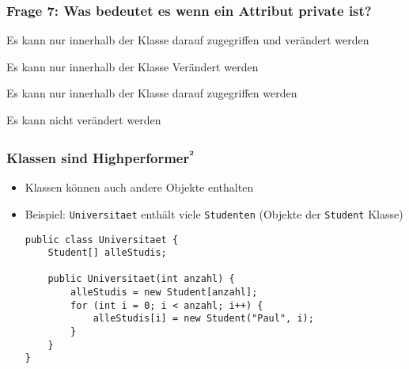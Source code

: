 \documentclass{../../presentation}
\begin{document}
\begin{frame}[fragile]
	\frametitle{Frage 7: Was bedeutet es wenn ein Attribut private ist?}
	\begin{ausgabe}
		\textcolor<2->{green!100!black}{Es kann nur innerhalb der Klasse darauf zugegriffen und verändert werden}
	\end{ausgabe}
	\begin{ausgabe}
		Es kann nur innerhalb der Klasse Verändert werden
	\end{ausgabe}
	\begin{ausgabe}
		Es kann nur innerhalb der Klasse darauf zugegriffen werden
	\end{ausgabe}
	\begin{ausgabe}
		Es kann nicht verändert werden
	\end{ausgabe}
\end{frame}

\begin{frame}[fragile]
	\frametitle{Klassen sind Highperformer\textsuperscript{²}}
	\pause
	\begin{itemize}
		\item Klassen können auch andere Objekte enthalten
		      \pause
		\item Beispiel: \texttt{Universitaet} enthält viele \texttt{Studenten} (Objekte der \texttt{Student} Klasse)
		      \pause
		      \begin{verbatim}
public class Universitaet {
    Student[] alleStudis;

    public Universitaet(int anzahl) {
        alleStudis = new Student[anzahl];
        for (int i = 0; i < anzahl; i++) {
            alleStudis[i] = new Student("Paul", i);
        }
    }
}
\end{verbatim}
	\end{itemize}
\end{frame}
\end{document}
